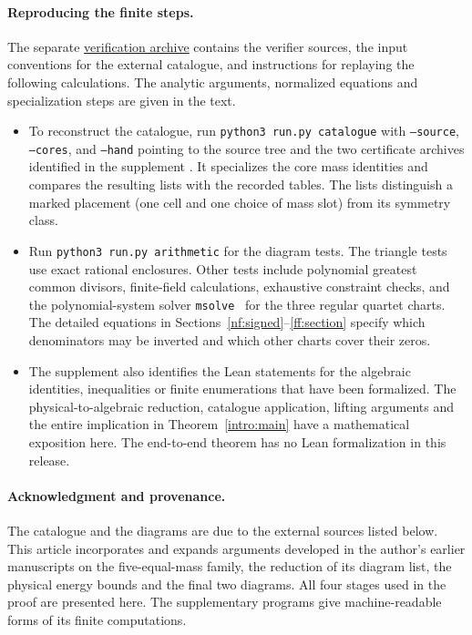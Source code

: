 \documentclass[11pt,letterpaper]{article}
\theoremstyle{definition}
\newcommand{\suppfile}{\href{https://github.com/rongyulin/physics-open-problems-AI/raw/refs/heads/main/problems/planar-central-configurations/papers/FiveEqualFiniteness-checks.zip}{verification archive}}
\begin{document}
\paragraph{Reproducing the finite steps.}
The separate \suppfile{} contains the verifier sources, the input conventions for the external catalogue, and instructions for replaying the following calculations. The analytic arguments, normalized equations and specialization steps are given in the text.
\begin{itemize}
\item To reconstruct the catalogue, run \texttt{python3 run.py catalogue} with \texttt{--source}, \texttt{--cores}, and \texttt{--hand} pointing to the source tree and the two certificate archives identified in the supplement \cite{Data}. It specializes the core mass identities and compares the resulting lists with the recorded tables. The lists distinguish a marked placement (one cell and one choice of mass slot) from its symmetry class.
\item Run \texttt{python3 run.py arithmetic} for the diagram tests. The triangle tests use exact rational enclosures. Other tests include polynomial greatest common divisors, finite-field calculations, exhaustive constraint checks, and the polynomial-system solver \texttt{msolve}~\cite{msolve} for the three regular quartet charts. The detailed equations in Sections~\ref{nf:signed}--\ref{ff:section} specify which denominators may be inverted and which other charts cover their zeros.
\item The supplement also identifies the Lean statements for the algebraic identities, inequalities or finite enumerations that have been formalized. The physical-to-algebraic reduction, catalogue application, lifting arguments and the entire implication in Theorem~\ref{intro:main} have a mathematical exposition here. The end-to-end theorem has no Lean formalization in this release.
\end{itemize}

\paragraph{Acknowledgment and provenance.}
The catalogue and the diagrams are due to the external sources listed below. This article incorporates and expands arguments developed in the author's earlier manuscripts on the five-equal-mass family, the reduction of its diagram list, the physical energy bounds and the final two diagrams. All four stages used in the proof are presented here. The supplementary programs give machine-readable forms of its finite computations.
\end{document}
